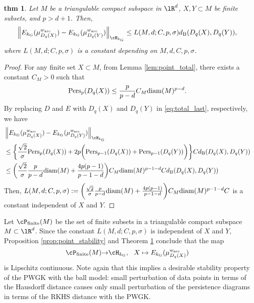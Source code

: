 \documentclass{article}
\newtheorem{thm}{thm}[section]
\newcommand{\ra}{{\rightarrow}}
\newcommand{\Pers}{{\rm Pers}}
\newcommand{\diam}{{\rm diam}}
\providecommand{\norm}[1]{\left\lVert#1\right\rVert}
\providecommand{\dk}[4]{\norm{E_{#1}(\mu^{#2}_{#3}) - E_{#1}(\mu^{#2}_{#4})}_{\cH_{#1}}}
\begin{document}
\begin{thm}
\label{thm:kernel_stability}
Let $M$ be a triangulable compact subspace in $\lR^{d}$, $X,Y \subset M$ be finite subsets, and $p>d+1$.
Then,
\[
\dk{k_{{\rm G}}}{w_{{\rm arc}}}{D_{q}(X)}{D_{q}(Y)} \leq L(M,d;C,p,\sigma) d_{{\rm B}}(D_{q}(X),D_{q}(Y)),
\]
where $L(M,d;C,p,\sigma)$ is a constant depending on $M,d,C,p,\sigma$.
\end{thm}

\begin{proof}
For any finite set $X \subset M$, from Lemma \ref{lem:point_total}, there exists a constant $C_{M}>0$ such that
\[
\Pers_{p}(D_{q}(X)) \leq \frac{p}{p-d} C_{M}\diam(M)^{p-d}.
\]
By replacing $D$ and $E$ with $D_{q}(X)$ and $D_{q}(Y)$ in \eqref{eq:total_last}, respectively, we have 
\begin{align*}
& \dk{k_{{\rm G}}}{w_{{\rm arc}}}{D_{q}(X)}{D_{q}(Y)} \\
& \leq \biggl\{ \frac{\sqrt{2}}{\sigma} \Pers_{p}(D_{q}(X))+ 2p \biggl( \Pers_{p-1}(D_{q}(X)) + \Pers_{p-1}(D_{q}(Y)) \biggr)  \biggr\} C d_{{\rm B}}(D_{q}(X),D_{q}(Y))  \\
& \leq \biggl( \frac{\sqrt{2}}{\sigma} \frac{p}{p-d} \diam(M) + \frac{4p(p-1)}{p-1-d}  \biggr) C_{M}\diam(M)^{p-1-d}C d_{{\rm B}}(D_{q}(X),D_{q}(Y))
\end{align*}
Then, $L(M,d;C,p,\sigma):=\biggl( \frac{\sqrt{2}}{\sigma} \frac{p}{p-d} \diam(M) + \frac{4p(p-1)}{p-1-d}  \biggr) C_{M}\diam(M)^{p-1-d}C$ is a constant independent of $X$ and $Y$.
\end{proof}

Let $\cP_{{\rm finite}}(M)$ be the set of finite subsets in a triangulable compact subspace $M \subset \lR^{d}$.
Since the constant $L(M,d;C,p,\sigma)$ is independent of $X$ and $Y$, Proposition \ref{prop:point_stability} and Theorem \ref{thm:kernel_stability} conclude that the map
\[
\cP_{{\rm finite}}(M) \ra \cH_{k_{{\rm G}}} , ~~ X \mapsto E_{k_{{\rm G}}}(\mu_{D_{q}(X)}^{w_{{\rm arc}}})
\]
is Lipschitz continuous.
Note again that this implies a desirable stability property of the PWGK with the ball model: small perturbation of data points in terms of the Hausdorff distance causes only small perturbation of the persistence diagrams in terms of the RKHS distance with the PWGK.
\end{document}
